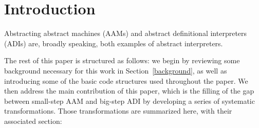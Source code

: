 \documentclass[acmsmall,review,anonymous]{acmart}\settopmatter{printfolios=true,printccs=false,printacmref=false}
\begin{document}




\maketitle

\section{Introduction}

Abstracting abstract machines (AAMs) and abstract definitional interpreters (ADIs) are, broadly speaking, both examples of abstract interpreters. 


The rest of this paper is structured as follows: we begin by reviewing some background
necessary for this work in Section~\ref{background}, as well as introducing some of the basic
code structures used throughout the paper. We then address the main contribution of this
paper, which is the filling of the gap between small-step AAM and big-step ADI by developing a
series of systematic transformations. Those transformations are summarized here, with their
associated section:
\end{document}
